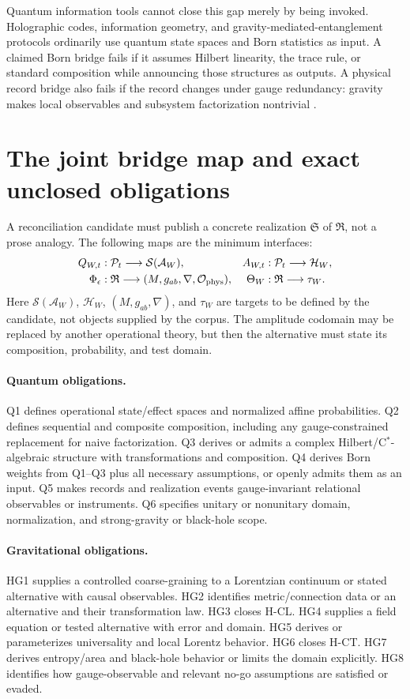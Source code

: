 \documentclass[11pt,a4paper]{article}
\theoremstyle{remark}
\newcommand{\Rel}{\mathfrak R}
\newcommand{\Poss}{\mathcal P}
\newcommand{\Obs}{\mathcal O}
\begin{document}
Quantum information tools cannot close this gap merely by being invoked.
Holographic codes, information geometry, and gravity-mediated-entanglement
protocols ordinarily use quantum state spaces and Born statistics as input. A
claimed Born bridge fails if it assumes Hilbert linearity, the trace rule, or
standard composition while announcing those structures as outputs. A physical
record bridge also fails if the record changes under gauge redundancy: gravity
makes local observables and subsystem factorization nontrivial
\citep{donnelly2016}.

\section{The joint bridge map and exact unclosed obligations}\label{sec:bridges}
A reconciliation candidate must publish a concrete realization $\mathfrak S$ of
$\Rel$, not a prose analogy. The following maps are the minimum interfaces:
\[
 \begin{aligned}
 Q_{W,t}&:\Poss_t\longrightarrow\mathcal S(\mathcal A_W), &
 A_{W,t}&:\Poss_t\longrightarrow\mathcal H_W,\\
 \Phi_\epsilon&:\Rel\longrightarrow(M,g_{ab},\nabla,\Obs_{\rm phys}), &
 \Theta_W&:\Rel\longrightarrow\tau_W .
 \end{aligned}
\]
Here $\mathcal S(\mathcal A_W)$, $\mathcal H_W$, $(M,g_{ab},\nabla)$, and
$\tau_W$ are targets to be defined by the candidate, not objects supplied by the
corpus. The amplitude codomain may be replaced by another operational theory,
but then the alternative must state its composition, probability, and test
domain.

\paragraph{Quantum obligations.} Q1 defines operational state/effect spaces and
normalized affine probabilities. Q2 defines sequential and composite
composition, including any gauge-constrained replacement for naive
factorization. Q3 derives or admits a complex Hilbert/C$^*$-algebraic structure
with transformations and composition. Q4 derives Born weights from Q1--Q3 plus
all necessary assumptions, or openly admits them as an input. Q5 makes records
and realization events gauge-invariant relational observables or instruments.
Q6 specifies unitary or nonunitary domain, normalization, and strong-gravity or
black-hole scope.

\paragraph{Gravitational obligations.} HG1 supplies a controlled coarse-graining
to a Lorentzian continuum or stated alternative with causal observables. HG2
identifies metric/connection data or an alternative and their transformation
law. HG3 closes H-CL. HG4 supplies a field equation or tested alternative with
error and domain. HG5 derives or parameterizes universality and local Lorentz
behavior. HG6 closes H-CT. HG7 derives entropy/area and black-hole behavior or
limits the domain explicitly. HG8 identifies how gauge-observable and relevant
no-go assumptions are satisfied or evaded.
\end{document}
